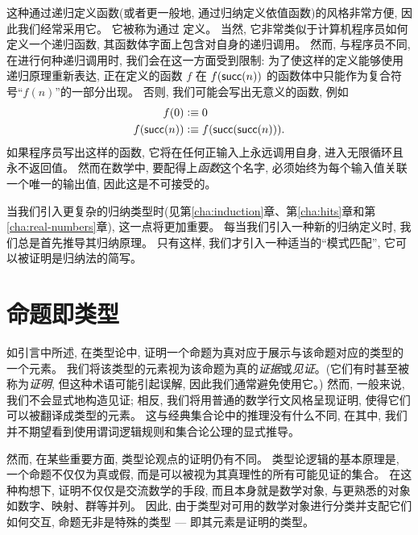 这种通过递归定义函数(或者更一般地, 通过归纳定义依值函数)的风格非常方便, 因此我们经常采用它。
它被称为通过  定义。
当然, 它非常类似于计算机程序员如何定义一个递归函数, 其函数体字面上包含对自身的递归调用。
然而, 与程序员不同, 在进行何种递归调用时, 我们会在这一方面受到限制: 为了使这样的定义能够使用递归原理重新表达, 正在定义的函数 $f$ 在 $f(\mathsf{succ}(n))$ 的函数体中只能作为复合符号``$f(n)$''的一部分出现。
否则, 我们可能会写出无意义的函数, 例如
\begin{align*}
  f(0)&\vcentcolon\equiv 0\\
  f(\mathsf{succ}(n)) &\vcentcolon\equiv f(\mathsf{succ}(\mathsf{succ}(n))).
\end{align*}
如果程序员写出这样的函数, 它将在任何正输入上永远调用自身, 进入无限循环且永不返回值。
然而在数学中, 要配得上\emph{函数}这个名字, 必须始终为每个输入值关联一个唯一的输出值, 因此这是不可接受的。

当我们引入更复杂的归纳类型时(见第\ref{cha:induction}章、第\ref{cha:hits}章和第\ref{cha:real-numbers}章), 这一点将更加重要。
每当我们引入一种新的归纳定义时, 我们总是首先推导其归纳原理。
只有这样, 我们才引入一种适当的``模式匹配'', 它可以被证明是归纳法的简写。

%
%

\section{命题即类型}
\label{sec:pat}

%
%
如引言中所述, 在类型论中, 证明一个命题为真对应于展示与该命题对应的类型的一个元素。
%
%
我们将该类型的元素视为该命题为真的\emph{证据}或\emph{见证}。(它们有时甚至被称为\emph{证明}, 但这种术语可能引起误解, 因此我们通常避免使用它。)
然而, 一般来说, 我们不会显式地构造见证; 相反, 我们将用普通的数学行文风格呈现证明, 使得它们可以被翻译成类型的元素。
这与经典集合论中的推理没有什么不同, 在其中, 我们并不期望看到使用谓词逻辑规则和集合论公理的显式推导。

然而, 在某些重要方面, 类型论观点的证明仍有不同。
类型论逻辑的基本原理是, 一个命题不仅仅为真或假, 而是可以被视为其真理性的所有可能见证的集合。
在这种构想下, 证明不仅仅是交流数学的手段, 而且本身就是数学对象, 与更熟悉的对象如数字、映射、群等并列。
因此, 由于类型对可用的数学对象进行分类并支配它们如何交互, 命题无非是特殊的类型 --- 即其元素是证明的类型。

